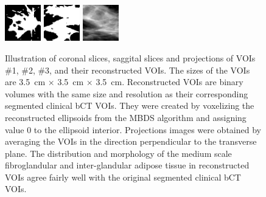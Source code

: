 \documentclass[journal]{IEEEtran}
\begin{document}
\begin{figure}[!htb]
   \includegraphics[width=0.14\textwidth]
  {figure/all/dataset_11/roi_coronal}
  \includegraphics[width=0.14\textwidth]
  {figure/all/dataset_11/roi_saggital}
  \includegraphics[width=0.14\textwidth]
  {figure/all/dataset_11/proj_roi}


  \caption{Illustration of coronal slices, saggital slices and
    projections of VOIs \#1, \#2, \#3, and their reconstructed
    VOIs. The sizes of the VOIs are \SI{3.5}{\cm} $\times$
    \SI{3.5}{\cm} $\times$ \SI{3.5}{\cm}. Reconstructed VOIs are
    binary volumes with the same size and resolution as their
    corresponding segmented clinical bCT VOIs. They were created by
    voxelizing the reconstructed ellipsoids from the MBDS algorithm
    and assigning value 0 to the ellipsoid interior. Projections
    images were obtained by averaging the VOIs in the direction
    perpendicular to the transverse plane. The distribution and
    morphology of the medium scale fibroglandular and inter-glandular
    adipose tissue in reconstructed VOIs agree fairly well with the
    original segmented clinical bCT VOIs.}
  \label{fig:bct-datasets-recon}

\end{figure}
\end{document}
